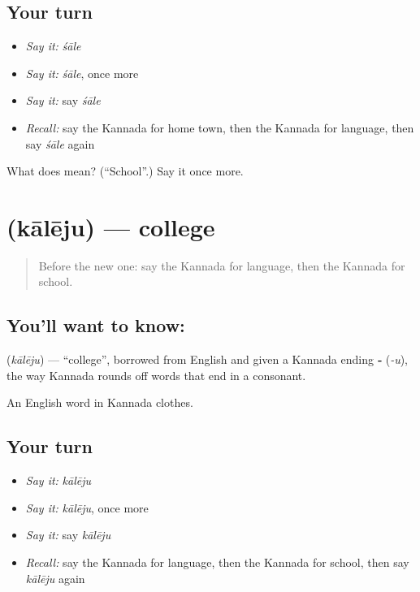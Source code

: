 \subsection*{Your turn}
\begin{itemize}
\raggedright
  \item \emph{Say it:} \emph{śāle}
  \item \emph{Say it:} \emph{śāle}, once more
  \item \emph{Say it:} say \emph{śāle}
  \item \emph{Recall:} say the Kannada for home town, then the Kannada for language, then say \emph{śāle} again
\end{itemize}

\begin{tcolorbox}[breakable,colback=teal!4,colframe=teal!35!black,title={Before you move on}]
What does  mean? (\textquotedblleft{}School\textquotedblright{}.) Say it once more.
\end{tcolorbox}
\section[\texorpdfstring{\kn{ಕಾಲೇಜು} (kālēju)}{ಕಾಲೇಜು (kālēju)}]{ (kālēju) — college}

\label{lesson:KA-C92-college}



\begin{quote}
Before the new one: say the Kannada for language, then the Kannada for school.
\end{quote}

\subsection*{You'll want to know: }
\textbf{} (\emph{kālēju}) — \textquotedblleft{}college\textquotedblright{}, borrowed from English and given a Kannada ending \textbf{‑} (\emph{-u}), the way Kannada rounds off words that end in a consonant.

\begin{grammarlens}[title={What you've built}]
An English word in Kannada clothes.
\end{grammarlens}

\subsection*{Your turn}
\begin{itemize}
\raggedright
  \item \emph{Say it:} \emph{kālēju}
  \item \emph{Say it:} \emph{kālēju}, once more
  \item \emph{Say it:} say \emph{kālēju}
  \item \emph{Recall:} say the Kannada for language, then the Kannada for school, then say \emph{kālēju} again
\end{itemize}

